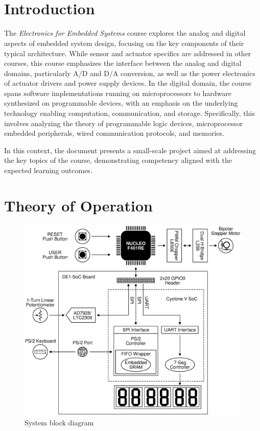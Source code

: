 \documentclass[]{article}
\title{\textbf{\Course}\\\Title}
\author{\Authors}
\date{\Date}
\begin{document}

\maketitle
\tableofcontents
\vfill
\printbibliography
\clearpage

\section{Introduction}

The \emph{Electronics for Embedded Systems} course explores the analog and digital aspects of embedded system design, focusing on the key components of their typical architecture. While sensor and actuator specifics are addressed in other courses, this course emphasizes the interface between the analog and digital domains, particularly A/D and D/A conversion, as well as the power electronics of actuator drivers and power supply devices. In the digital domain, the course spans software implementations running on microprocessors to hardware synthesized on programmable devices, with an emphasis on the underlying technology enabling computation, communication, and storage. Specifically, this involves analyzing the theory of programmable logic devices, microprocessor embedded peripherals, wired communication protocols, and memories.

In this context, the document presents a small-scale project aimed at addressing the key topics of the course, demonstrating competency aligned with the expected learning outcomes.

\section{Theory of Operation}\label{sec:theory_operation}

\begin{figure}
    \centering
    \includegraphics[width=\linewidth]{gfx/system_diagram.eps}
    \caption{System block diagram}
    \label{fig:sys}
\end{figure}
\end{document}
